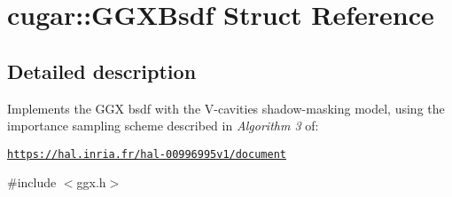 \hypertarget{structcugar_1_1_g_g_x_bsdf}{}\section{cugar\+:\+:G\+G\+X\+Bsdf Struct Reference}
\label{structcugar_1_1_g_g_x_bsdf}


\subsection{Detailed description}
Implements the G\+GX bsdf with the V-\/cavities shadow-\/masking model, using the importance sampling scheme described in {\itshape Algorithm 3} of\+:

\href{https://hal.inria.fr/hal-00996995v1/document}{\tt https\+://hal.\+inria.\+fr/hal-\/00996995v1/document} 

{\ttfamily \#include $<$ggx.\+h$>$}


